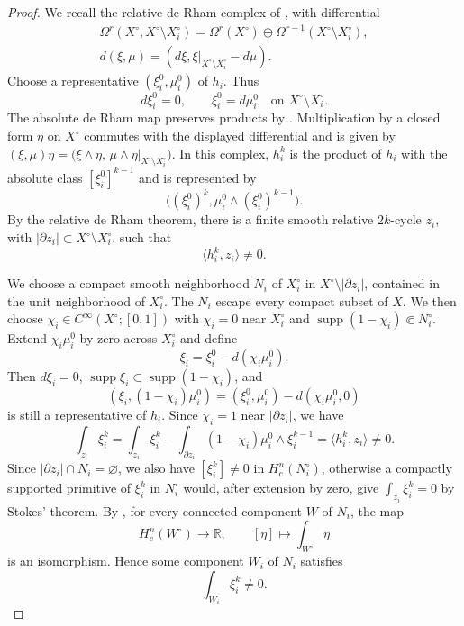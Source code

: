 \documentclass[12pt,reqno]{amsart}
\numberwithin{equation}{section}
\theoremstyle{definition}
\newcommand{\supp}{\operatorname{supp}}
\begin{document}
\begin{proof}
We recall the relative de Rham complex of
\cite[\S6, pp.~78--79]{BottTu}, with differential
\[
\begin{gathered}
 \Omega^r(X^\circ,X^\circ\setminus X_i^\circ)
 =\Omega^r(X^\circ)\oplus
 \Omega^{r-1}(X^\circ\setminus X_i^\circ),\\
 d(\xi,\mu)=
 (d\xi,\xi|_{X^\circ\setminus X_i^\circ}-d\mu).
\end{gathered}
\]
Choose a representative $(\xi_i^0,\mu_i^0)$ of $h_i$.  Thus
\[
 d\xi_i^0=0,
 \qquad \xi_i^0=d\mu_i^0
 \quad\text{on }X^\circ\setminus X_i^\circ.
\]
The absolute de Rham map preserves products by
\cite[Theorems~14.28, 15.8 and the discussion following (15.9)]{BottTu}.
Multiplication by a closed form $\eta$ on $X^\circ$ commutes with
the displayed differential and is given by $(\xi,\mu)\eta = \bigl(\xi\wedge\eta,\,\mu\wedge\eta|_{X^\circ\setminus X_i^\circ}\bigr)$. In this complex, $h_i^k$ is the product of $h_i$ with the absolute
class $[\xi_i^0]^{k-1}$ and is represented by
\begin{equation}\label{eq:H-relative-power}
 \bigl((\xi_i^0)^k,
       \mu_i^0\wedge(\xi_i^0)^{k-1}\bigr).
\end{equation}
By the relative de Rham theorem, there is a finite smooth relative
$2k$-cycle $z_i$, with $|\partial z_i|\subset
X^\circ\setminus X_i^\circ$, such that
\[
 \langle h_i^k,z_i\rangle\ne0.
\]

We choose a compact smooth neighborhood $N_i$ of $X_i^\circ$ in
$X^\circ\setminus|\partial z_i|$, contained in the unit neighborhood
of $X_i^\circ$.  The $N_i$ escape every compact subset of $X$.
We then choose $\chi_i\in C^\infty(X^\circ;[0,1])$ with
$\chi_i=0$ near $X_i^\circ$ and
$\supp(1-\chi_i)\Subset N_i^\circ$.  Extend $\chi_i\mu_i^0$ by zero
across $X_i^\circ$ and define
\[
 \xi_i=\xi_i^0-d(\chi_i\mu_i^0).
\]
Then $d\xi_i=0$, $\supp\xi_i\subset\supp(1-\chi_i)$, and
\[
 (\xi_i,(1-\chi_i)\mu_i^0)
 =(\xi_i^0,\mu_i^0)-d(\chi_i\mu_i^0,0)
\]
is still a representative of $h_i$.  Since $\chi_i=1$ near $|\partial z_i|$, we have
\begin{equation}\label{eq:H-cycle-pairing}
 \int_{z_i}\xi_i^k= \int_{z_i}\xi_i^k - \int_{\partial z_i}(1-\chi_i)\mu_i^0\wedge\xi_i^{k-1}= \langle h_i^k,z_i\rangle\ne0.
\end{equation}
Since $|\partial z_i|\cap N_i=\varnothing$, we also have $[\xi_i^k]\ne0$ in $H_c^n(N_i^\circ)$, otherwise a compactly supported
primitive of $\xi_i^k$ in $N_i^\circ$ would, after extension by zero,
give $\int_{z_i}\xi_i^k=0$ by Stokes' theorem. 
By \cite[Corollary~5.8]{BottTu}, for every connected component $W$
of $N_i$, the map
\[
 H_c^n(W^\circ)\longrightarrow\mathbb R,
 \qquad [\eta]\longmapsto\int_{W^\circ}\eta
\]
is an isomorphism.  Hence some component $W_i$ of $N_i$ satisfies
\begin{equation}\label{eq:H-local-form}
 \int_{W_i}\xi_i^k\ne0.
\end{equation}


\end{proof}
\end{document}

